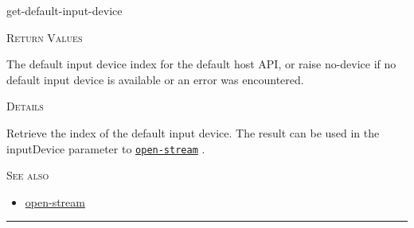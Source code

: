 \documentclass[a4paper]{report}
\begin{document}
    \label{portaudio__fun__get-default-input-device}
    \begin{defun}[Function]
    get-default-input-device


    
    \bigskip
    \textsc{Return Values}


The default input device index for the default host API, or raise no-device if no default input device is available or an error was encountered. 


	
    \bigskip
    \textsc{Details}

Retrieve the index of the default input device. The result can be used in the inputDevice parameter to \hyperref[portaudio__fun__open-stream]{\texttt{open-stream}}
  .


      
    \bigskip
    \textsc{See also}


	
    \begin{itemize}
    
	  
    \item
    \hyperref[portaudio__fun__open-stream]{open-stream}
    
	
    \end{itemize}
  
      


    
    \end{defun}
  
  

    \rule{\linewidth}{0.1mm}
    
\end{document}
